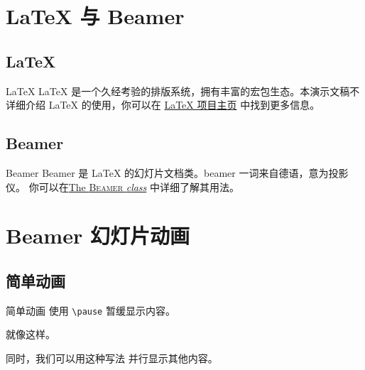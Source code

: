 \documentclass[aspectratio=169]{ctexbeamer} %
\title{\themetitle}
\subtitle{V2.2026b}
\author{\themeauthor}
\date{\today}
\institute{哈尔滨工业大学}
\begin{document}
\TitleSlide

\BlueTitleSlide

\OutlineSlide

\section{LaTeX 与 Beamer}

\subsection{LaTeX}

\begin{frame}{LaTeX}
  LaTeX 是一个久经考验的排版系统，拥有丰富的宏包生态。本演示文稿不详细介绍
  LaTeX 的使用，你可以在 \href{https://www.latex-project.org/}{LaTeX 项目主页}
  中找到更多信息。
\end{frame}

\subsection{Beamer}

\begin{frame}{Beamer}
  Beamer 是 LaTeX 的幻灯片文档类。beamer 一词来自德语，意为投影仪。
  \themecredit
  你可以在\href{https://latex.us/macros/latex/contrib/beamer/doc/beameruserguide.pdf}{The \textsc{Beamer} \textit{class}}
  中详细了解其用法。
  \parencite{beamer2026}
\end{frame}

\section{Beamer 幻灯片动画}

\subsection{简单动画}

\begin{frame}{简单动画}
  使用 \texttt{\textbackslash pause} \pause 暂缓显示内容。

  \pause
  就像这样。

  \setcounter{beamerpauses}{1}
  同时，\pause 我们可以用这种写法 \pause 并行显示其他内容。

\end{frame}
\end{document}
